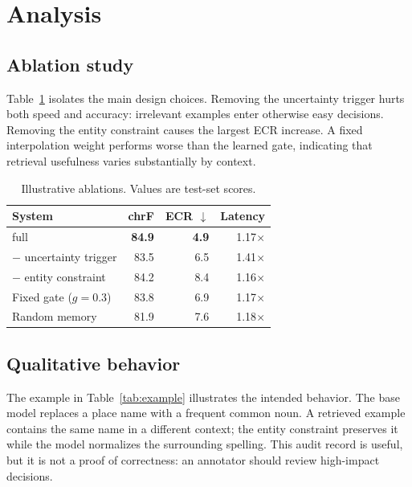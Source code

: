 \section{Analysis}
\label{sec:analysis}

\subsection{Ablation study}

Table~\ref{tab:ablation} isolates the main design choices. Removing the
uncertainty trigger hurts both speed and accuracy: irrelevant examples enter
otherwise easy decisions. Removing the entity constraint causes the largest
ECR increase. A fixed interpolation weight performs worse than the learned
gate, indicating that retrieval usefulness varies substantially by context.

\begin{table}[t]
  \centering
  \caption{Illustrative ablations. Values are test-set scores.}
  \label{tab:ablation}
  \small
  \begin{tabular}{lrrr}
    \toprule
    System & chrF & ECR $\downarrow$ & Latency \\
    \midrule
    \method{} full             & \textbf{84.9} & \textbf{4.9} & 1.17$\times$ \\
    $-$ uncertainty trigger    & 83.5 & 6.5 & 1.41$\times$ \\
    $-$ entity constraint      & 84.2 & 8.4 & 1.16$\times$ \\
    Fixed gate ($g=0.3$)       & 83.8 & 6.9 & 1.17$\times$ \\
    Random memory              & 81.9 & 7.6 & 1.18$\times$ \\
    \bottomrule
  \end{tabular}
\end{table}

\subsection{Qualitative behavior}

The example in Table~\ref{tab:example} illustrates the intended behavior. The
base model replaces a place name with a frequent common noun. A retrieved
example contains the same name in a different context; the entity constraint
preserves it while the model normalizes the surrounding spelling. This audit
record is useful, but it is not a proof of correctness: an annotator should
review high-impact decisions.


